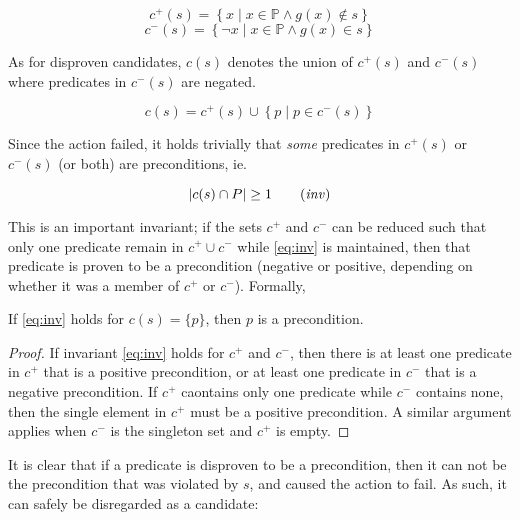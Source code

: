 \documentclass[../../Master.tex]{subfiles}
\begin{document}
\begin{equation} \label{eq:cPlus}
    c^+(s) = \left\{ x \; | \; x \in \mathbb{P} \land g(x) \notin s \right\}
\end{equation}
\begin{equation} \label{eq:cMinus}
    c^-(s) = \left\{ \neg x \; | \; x \in \mathbb{P} \land g(x) \in s \right\}
\end{equation}

As for disproven candidates, $c(s)$ denotes the union of $c^+(s)$ and $c^-(s)$ where predicates in $c^-(s)$ are negated.

\begin{equation}
    c(s) = c^+(s) \cup \left\{ p \; | \; p \in c^-(s) \right\}
\end{equation}

Since the action failed, it holds trivially that \textit{some} predicates in $c^+(s)$ or $c^-(s)$ (or both) are preconditions, ie.

\begin{equation} \label{eq:inv}
    \left| c(s) \cap P \right| \geq 1
    \tag{\emph{inv}}
\end{equation}

This is an important invariant; if the sets $c^+$ and $c^-$ can be reduced such that only one predicate remain in $c^+ \cup c^-$ while \eqref{eq:inv} is maintained, then that predicate is proven to be a precondition (negative or positive, depending on whether it was a member of $c^+$ or $c^-$). Formally,

\begin{theorem}
    If \eqref{eq:inv} holds for $c(s) = \{p\}$, then $p$ is a precondition.
\end{theorem}

\begin{proof}
    If invariant \eqref{eq:inv} holds for $c^+$ and $c^-$, then there is at least one predicate in $c^+$ that is a positive precondition, or at least one predicate in $c^-$ that is a negative precondition. If $c^+$ caontains only one predicate while $c^-$ contains none, then the single element in $c^+$ must be a positive precondition. A similar argument applies when $c^-$ is the singleton set and $c^+$ is empty.
\end{proof}

It is clear that if a predicate is disproven to be a precondition, then it can not be the precondition that was violated by $s$, and caused the action to fail. As such, it can safely be disregarded as a candidate:
\end{document}
